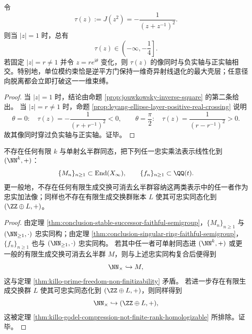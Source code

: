 \begin{theorem}[单位模壳是一维奇异射线束缚的极大壳]\label{thm:conclusion-singular-ring-unit-circle-maximal-shell}
令
\[
\tau(z):=J(z^2)=-\frac{1}{(z+z^{-1})^2}.
\]
则当 \(|z|=1\) 时，总有
\[
\tau(z)\in\left(-\infty,-\frac14\right].
\]
若固定 \(|z|=r\neq 1\) 并令 \(z=re^{\mathrm{i}\theta}\) 变化，则 \(\tau(z)\) 的像同时与负实轴与正实轴相交。特别地，单位模约束恰是逆平方门保持一维奇异射线退化的最大壳层；任意径向脱离都会立即打破这一一维束缚。
\end{theorem}
\begin{proof}
当 \(|z|=1\) 时，结论由命题 \ref{prop:jouwkowsky-inverse-square} 的第二条给出。
当 \(|z|=r\neq 1\) 时，命题 \ref{prop:leyang-ellipse-layer-positive-real-crossing} 说明
\[
\theta=0:\quad \tau(z)=-\frac{1}{(r+r^{-1})^2}<0,
\qquad
\theta=\frac{\pi}{2}:\quad \tau(z)=\frac{1}{(r-r^{-1})^2}>0.
\]
故其像同时穿过负实轴与正实轴。证毕。
\end{proof}

\begin{theorem}[稳定乘法作用与奇异环半共轭的共同有限加法线性化障碍]\label{thm:conclusion-common-finite-additive-linearization-obstruction}
不存在任何有限 \(k\) 与单射幺半群同态，把下列任一忠实乘法表示线性化到 \((\NN^k,+)\)：
\[
\{M_n\}_{n\ge 1}\subset \operatorname{End}(X_\infty),
\qquad
\{f_n\}_{n\ge 1}\subset \QQ(t).
\]
更一般地，不存在任何有限生成交换可消去幺半群容纳这两类表示中的任一者作为忠实加法像；同样也不存在有限生成交换群账本 \(L\) 使其可忠实同态化到 \((\ZZ\oplus L,+)\)。
\end{theorem}
\begin{proof}
由定理 \ref{thm:conclusion-stable-successor-faithful-semigroup}，\(\{M_n\}_{n\ge 1}\) 与 \((\NN_{\ge 1},\cdot)\) 忠实同构；由定理 \ref{thm:conclusion-singular-ring-faithful-semigroup}，\(\{f_n\}_{n\ge 1}\) 也与 \((\NN_{\ge 1},\cdot)\) 忠实同构。
若其中任一者可单射同态进 \((\NN^k,+)\) 或更一般的有限生成交换可消去幺半群 \(M\)，则与上述忠实同构复合后便得到
\[
\NN_{\times}\hookrightarrow M,
\]
这与定理 \ref{thm:killo-prime-freedom-non-finitizability} 矛盾。
若进一步存在有限生成交换群 \(L\) 使其可忠实同态化到 \((\ZZ\oplus L,+)\)，则同样得到
\[
\NN_{\times}\hookrightarrow (\ZZ\oplus L,+),
\]
这被定理 \ref{thm:killo-godel-compression-not-finite-rank-homologizable} 所排除。证毕。
\end{proof}

